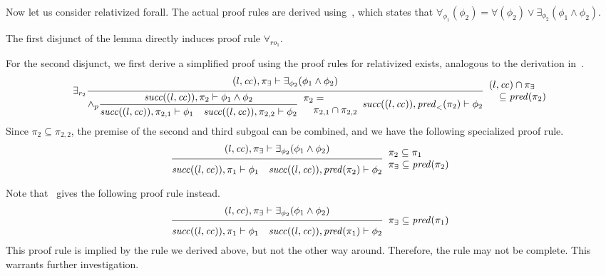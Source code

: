 \documentclass{article}
\newcommand{\proofrule}[3][]{#1 \frac{\raisebox{.7ex}{\normalsize{$#2$}}}
  {\raisebox{-1.0ex}{\normalsize{$#3$}}}}
\newcommand{\placeholder}[1][]{\pi_{#1}}
\newcommand{\loc}{l}
\newcommand{\region}{\mathit{cc}}
\newcommand{\suc}{\mathit{succ}}
\newcommand{\pre}{\mathit{pred}}
\begin{document}
Now let us consider relativized forall. The actual proof rules are derived using~\cite[Lemma 1]{FC:14}, which states that $\forall_{\phi_1}(\phi_2) = \forall(\phi_2) \lor \exists_{\phi_2}(\phi_1 \land \phi_2)$.

The first disjunct of the lemma directly induces proof rule $\forall_{ro_1}$.

For the second disjunct, we first derive a simplified proof using the proof rules for relativized
exists, analogous to the
derivation in~\cite[Appendix C.1]{FC:14report}.
\[
\proofrule[\exists_{r_2}]
{(\loc, \region), \placeholder[\exists] \vdash \exists_{\phi_2}(\phi_1 \land \phi_2)}
{ {\proofrule[\land_p]
  {\suc((\loc, \region)), \placeholder[2] \vdash \phi_1 \land \phi_2}
  {\suc((\loc, \region)), \placeholder[2,1] \vdash \phi_1
    \quad \suc((\loc, \region)), \placeholder[2,2] \vdash \phi_2}
  \begin{array}{l}
  \placeholder[2] = \\
  \quad \placeholder[2,1] \cap \placeholder[2,2]
  \end{array}
  }
 \suc((\loc, \region)), \pre_{<}(\placeholder[2]) \vdash \phi_2
 }
\begin{array}{l}
(\loc, \region) \cap \placeholder[\exists] \\
\quad \subseteq \pre(\placeholder[2])
\end{array}
\]
Since $\placeholder[2] \subseteq \placeholder[2,2]$, the premise of the second and third subgoal
can be combined, and we have the following specialized proof rule.
\[
\proofrule
{(\loc, \region), \placeholder[\exists] \vdash \exists_{\phi_2}(\phi_1 \land \phi_2)}
{ \suc((\loc, \region)), \placeholder[1] \vdash \phi_1
\quad \suc((\loc, \region)), \pre(\placeholder[2]) \vdash \phi_2
 }
\begin{array}{l}
\placeholder[2] \subseteq \placeholder[1]\\
\placeholder[\exists] \subseteq \pre(\placeholder[2])
\end{array}
\]

{\color{red}
Note that~\cite[Appendix C.1]{FC:14report} gives the following proof rule instead.
\[
\proofrule
{(\loc, \region), \placeholder[\exists] \vdash \exists_{\phi_2}(\phi_1 \land \phi_2)}
{ \suc((\loc, \region)), \placeholder[1] \vdash \phi_1
\quad \suc((\loc, \region)), \pre(\placeholder[1]) \vdash \phi_2
 }
\begin{array}{l}
\placeholder[\exists] \subseteq \pre(\placeholder[1])
\end{array}
\]
This proof rule is implied by the rule we derived above, but not the other way around. Therefore, the rule may not be complete. This warrants further investigation.
}
\end{document}
